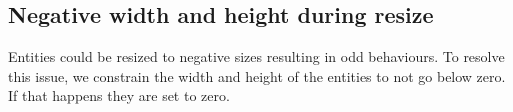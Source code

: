 \subsection{Negative width and height during resize}
Entities could be resized to negative sizes resulting in odd behaviours. 
To resolve this issue, we constrain the width and height of the entities to not go below zero. 
If that happens they are set to zero.